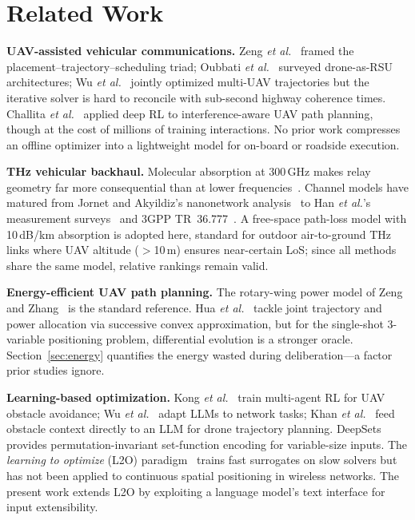 \documentclass[journal]{IEEEtran}
\begin{document}
\section{Related Work}
\label{sec:related}

\textbf{UAV-assisted vehicular communications.}
Zeng \textit{et al.}~\cite{zeng2016wireless} framed the placement--trajectory--scheduling triad; Oubbati \textit{et al.}~\cite{oubbati2020} surveyed drone-as-RSU architectures; Wu \textit{et al.}~\cite{wu2018multi} jointly optimized multi-UAV trajectories but the iterative solver is hard to reconcile with sub-second highway coherence times. Challita \textit{et al.}~\cite{challita2019} applied deep RL to interference-aware UAV path planning, though at the cost of millions of training interactions. No prior work compresses an offline optimizer into a lightweight model for on-board or roadside execution.

\textbf{THz vehicular backhaul.}
Molecular absorption at 300\,GHz makes relay geometry far more consequential than at lower frequencies~\cite{akyildiz2022, sarieddeen2021}. Channel models have matured from Jornet and Akyildiz's nanonetwork analysis~\cite{jornet2011} to Han \textit{et al.}'s measurement surveys~\cite{han2022} and 3GPP TR~36.777~\cite{3gpp36777}. A free-space path-loss model with 10\,dB/km absorption is adopted here, standard for outdoor air-to-ground THz links where UAV altitude ($>$10\,m) ensures near-certain LoS; since all methods share the same model, relative rankings remain valid.

\textbf{Energy-efficient UAV path planning.}
The rotary-wing power model of Zeng and Zhang~\cite{zeng2017energy} is the standard reference. Hua \textit{et al.}~\cite{hua2018} tackle joint trajectory and power allocation via successive convex approximation, but for the single-shot 3-variable positioning problem, differential evolution is a stronger oracle. Section~\ref{sec:energy} quantifies the energy wasted during deliberation---a factor prior studies ignore.

\textbf{Learning-based optimization.}
Kong \textit{et al.}~\cite{kong2023multi} train multi-agent RL for UAV obstacle avoidance; Wu \textit{et al.}~\cite{wu2024netllm} adapt LLMs to network tasks; Khan \textit{et al.}~\cite{khan2025llmnav} feed obstacle context directly to an LLM for drone trajectory planning. DeepSets~\cite{zaheer2017deepsets} provides permutation-invariant set-function encoding for variable-size inputs. The \emph{learning to optimize} (L2O) paradigm~\cite{bengio2021} trains fast surrogates on slow solvers but has not been applied to continuous spatial positioning in wireless networks. The present work extends L2O by exploiting a language model's text interface for input extensibility.
\end{document}
